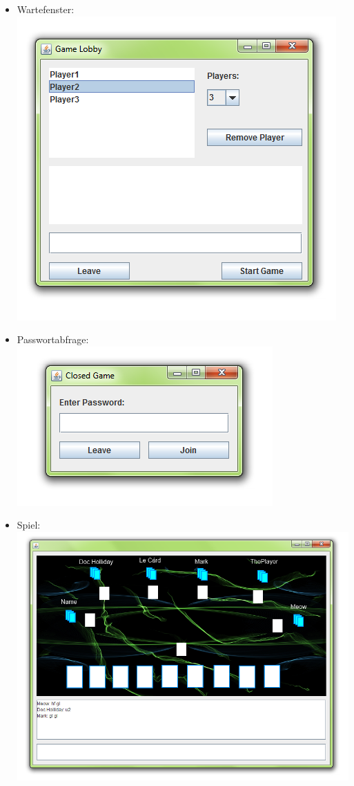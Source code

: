 \documentclass{article}
\begin{document}
\begin{itemize}
	\item Wartefenster: \\ \includegraphics[scale=0.7]{GUI_images/GameLobby}
	\item Passwortabfrage: \\ \includegraphics{GUI_images/PasswordRequest}
	\item Spiel: \\ \includegraphics[scale=0.6]{GUI_images/GameClient}
\end{itemize}
\end{document}
